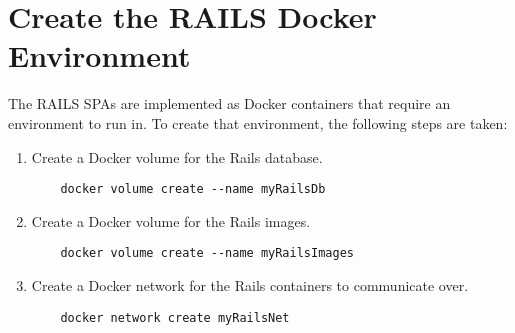 \section{Create the RAILS Docker Environment}
\label{sec:railsdockerenv}
The \ac{RAILS} \acp{SPA} are implemented as Docker containers that require an environment to run in. To create that environment, the following steps are taken:
\begin{enumerate}
    \item Create a Docker volume for the Rails database.
    \begin{verbatim}
    docker volume create --name myRailsDb  
    \end{verbatim}
    \item Create a Docker volume for the Rails images.
    \begin{verbatim}
    docker volume create --name myRailsImages
    \end{verbatim}
    \item Create a Docker network for the Rails containers to communicate over.
    \begin{verbatim}
    docker network create myRailsNet
    \end{verbatim}
\end{enumerate}
